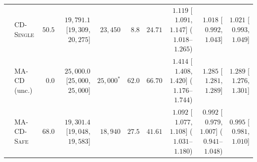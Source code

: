 \documentclass{article}
\theoremstyle{plain}
\theoremstyle{definition}
\begin{document}
\begin{table}[!htbp]
{\begin{tabular}{@{}llrrrrrrrr@{}}
  & \textsc{CD-Single}         & $50.5$  & $19{,}791.1$ [$19{,}309$, $20{,}275$] & $23{,}450$ & $8.8$  & $24.71$ & $1.119$ [$1.091$, $1.147$] ($1.018$--$1.265$) & $1.018$ [$0.992$, $1.043$] & $1.021$ [$0.993$, $1.049$] \\
  & \textsc{MA-CD} (unc.)      & $0.0$   & $25{,}000.0$ [$25{,}000$, $25{,}000$] & $25{,}000^*$ & $62.0$ & $66.70$ & $1.414$ [$1.408$, $1.420$] ($1.176$--$1.744$) & $1.285$ [$1.281$, $1.289$] & $1.289$ [$1.276$, $1.301$] \\
  & \textsc{MA-CD-Safe}        & $68.0$  & $19{,}301.4$ [$19{,}048$, $19{,}583$] & $18{,}940$ & $27.5$ & $41.61$ & $1.092$ [$1.077$, $1.108$] ($1.031$--$1.180$) & $0.992$ [$0.979$, $1.007$] ($0.941$--$1.048$) & $0.995$ [$0.981$, $1.010$] \\
\bottomrule
\end{tabular}%
}
\end{table}
\end{document}

